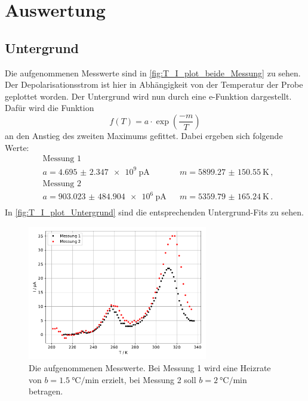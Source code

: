 \section{Auswertung}
\label{sec:Auswertung}

\subsection{Untergrund}
  Die aufgenommenen Messwerte sind in \autoref{fig:T_I_plot_beide_Messung} zu sehen.
  Der Depolarisationsstrom ist hier in Abhängigkeit von der Temperatur der Probe geplottet worden.
  Der Untergrund wird nun durch eine e-Funktion dargestellt.
  Dafür wird die Funktion
  \begin{equation*}
    f(T) = a \cdot \exp(\frac{-m}{T})
  \end{equation*}
  an den Anstieg des zweiten Maximums gefittet.
  Dabei ergeben sich folgende Werte:
  \begin{align*}
    &\text{Messung 1}\\
    &a =  \SI{4.695(2347)e9}{\pico\ampere} &&  m = \SI{5899.27(15055)}{\kelvin} \, ,\\
    &\text{Messung 2}\\
    &a = \SI{903.023(484904)e6}{\pico\ampere} &&  m = \SI{5359.79(16524)}{\kelvin} \, .\\
  \end{align*}
  In \autoref{fig:T_I_plot_Untergrund} sind die entsprechenden Untergrund-Fits zu sehen.

  \begin{figure}[H]
    \centering
    \includegraphics[width = 0.7\textwidth]{build/plot.pdf}
    \caption{Die aufgenommenen Messwerte. Bei Messung 1 wird eine Heizrate von $b = \SI{1.5}{\celsius\per\minute}$ erzielt, 
    bei Messung 2 soll $b = \SI{2}{\celsius\per\minute}$ betragen.}
    \label{fig:T_I_plot_beide_Messung}
  \end{figure} %

